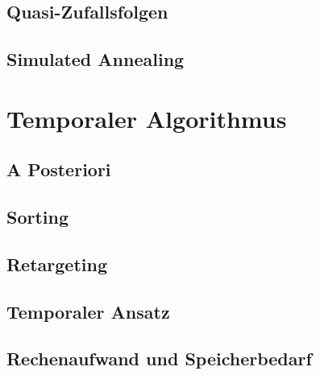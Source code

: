 \newpage
\section{Quasi-Zufallsfolgen}
\label{ch:Content1:sec:Quasi-Zufallsfolgen}



\newpage
\section{Simulated Annealing}
\label{ch:Content2:sec:Simulated Annealing}




\newpage
\chapter{Temporaler Algorithmus}
\label{ch:Temporaler Algorithmus}


\newpage
\section{A Posteriori}
\label{ch:Content2:sec:a Posteriori}




\newpage
\section{Sorting}
\label{ch:Content2:sec:Sorting}




\newpage
\section{Retargeting}
\label{ch:Content2:sec:Retargeting}


\newpage
\section{Temporaler Ansatz}
\label{ch:Content2:sec:Temporaler Ansatz}


\newpage
\section{Rechenaufwand und Speicherbedarf}
\label{ch:Content2:sec:Rechenaufwand}





